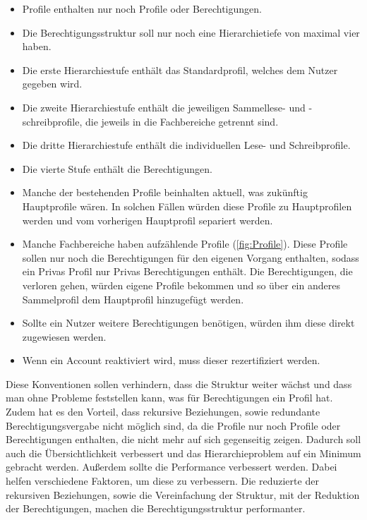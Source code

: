 \begin{itemize}
	\item Profile enthalten nur noch Profile oder Berechtigungen.
	\item Die Berechtigungsstruktur soll nur noch eine Hierarchietiefe von maximal vier haben.
	\item Die erste Hierarchiestufe enthält das Standardprofil, welches dem Nutzer gegeben wird.
	\item Die zweite Hierarchiestufe enthält die jeweiligen Sammellese- und -schreibprofile, die jeweils in die Fachbereiche getrennt sind.
	\item Die dritte Hierarchiestufe enthält die individuellen Lese- und Schreibprofile.
	\item Die vierte Stufe enthält die Berechtigungen.
	\item Manche der bestehenden Profile beinhalten aktuell, was zukünftig Hauptprofile wären.
In solchen Fällen würden diese Profile zu Hauptprofilen werden und vom vorherigen Hauptprofil separiert werden.
	\item Manche Fachbereiche haben aufzählende Profile (\ref{fig:Profile}).
Diese Profile sollen nur noch die Berechtigungen für den eigenen Vorgang enthalten, sodass ein Privas Profil nur Privas Berechtigungen enthält.
Die Berechtigungen, die verloren gehen, würden eigene Profile bekommen und so über ein anderes Sammelprofil dem Hauptprofil hinzugefügt werden.
	\item Sollte ein Nutzer weitere Berechtigungen benötigen, würden ihm diese direkt zugewiesen werden.
	\item Wenn ein Account reaktiviert wird, muss dieser rezertifiziert werden.
\end{itemize}
Diese Konventionen sollen verhindern, dass die Struktur weiter wächst und dass man ohne Probleme feststellen kann, was für Berechtigungen ein Profil hat.
Zudem hat es den Vorteil, dass rekursive Beziehungen, sowie redundante Berechtigungsvergabe nicht möglich sind, da die Profile nur noch Profile oder Berechtigungen enthalten, die nicht mehr auf sich gegenseitig zeigen.
Dadurch soll auch die Übersichtlichkeit verbessert und das Hierarchieproblem auf ein Minimum gebracht werden.
Außerdem sollte die Performance verbessert werden.
Dabei helfen verschiedene Faktoren, um diese zu verbessern.
Die reduzierte der rekursiven Beziehungen, sowie die Vereinfachung der Struktur, mit der Reduktion der Berechtigungen, machen die Berechtigungsstruktur performanter.
